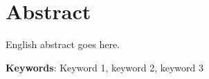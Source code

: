 \chapter*{Abstract}
English abstract goes here.

\vfill
\noindent\textbf{Keywords}: Keyword 1, keyword 2, keyword 3
